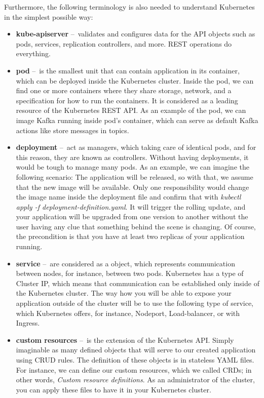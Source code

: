 \documentclass{ExcelAtFIT}
\begin{document}
Furthermore, the following terminology is also needed to understand Kubernetes in the simplest possible way:
\begin{itemize}
 \item \textbf{kube-apiserver} \---\ validates and configures data for the API objects such as pods, services, replication controllers, and more. REST operations do everything.
   \item \textbf{pod} \---\  is the smallest unit that can contain application in its container, which can be deployed inside the Kubernetes cluster. Inside the pod, we can find one or more containers where they share storage, network, and a specification for how to run the containers. It is considered as a leading resource of the Kubernetes REST API. As an example of the pod, we can image Kafka running inside pod's container, which can serve as default Kafka actions like store messages in topics.
  \item \textbf{deployment} \---\   act as managers, which taking care of identical pods, and for this reason, they are known as controllers. Without having deployments, it would be tough to manage many pods. As an example, we can imagine the following scenario: 
  The application will be released, so with that, we assume that the new image will be available. Only one responsibility would change the image name inside the deployment file and confirm that with \emph{kubectl apply -f deployment-definition.yaml}. It will trigger the rolling update, and your application will be upgraded from one version to another without the user having any clue that something behind the scene is changing. Of course, the precondition is that you have at least two replicas of your application running.
 \item \textbf{service} \---\  are considered as a object, which represents communication between nodes, for instance, between two pods. Kubernetes has a type of Cluster IP, which means that communication can be established only inside of the Kubernetes cluster. The way how you will be able to expose your application outside of the cluster will be to use the following type of service, which Kubernetes offers, for instance, Nodeport, Load-balancer, or with Ingress.
 \item \textbf{custom resources} \---\  is the extension of the Kubernetes API. Simply imaginable as many defined objects that will serve to our created application using CRUD rules. The definition of these objects is in stateless YAML files. For instance, we can define our custom resources, which we called CRDs; in other words, \emph{Custom resource definitions}. As an administrator of the cluster, you can apply these files to have it in your Kubernetes cluster.
\end{itemize}
\end{document}
